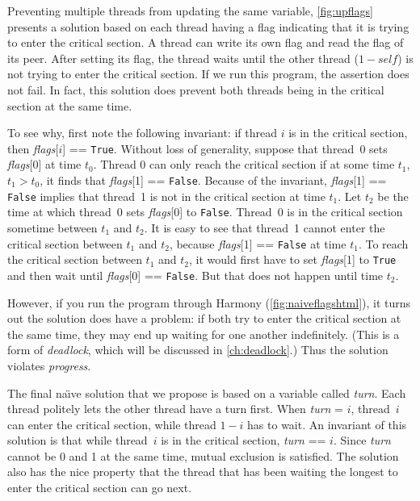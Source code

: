\documentclass{report}
\begin{document}
Preventing multiple threads from updating the same variable,
\autoref{fig:upflags} presents a solution based on each thread having
a flag indicating that it is trying to enter the critical section.
A thread can write its own flag and read the flag of its peer.
After setting its flag, the thread waits until the other thread
($1 - \mathit{self}$) is not trying to enter the critical section.
If we run this program, the assertion does not fail.  In fact, this
solution does prevent both threads being in the critical section at
the same time.

To see why, first note the following invariant: if thread $i$ is in the
critical section, then \textit{flags}[$i$] == \texttt{True}.
Without loss of generality,
suppose that thread~0 sets \textit{flags}[0] at time $t_0$.
Thread 0 can only reach the critical section if at some time $t_1$,
$t_1 > t_0$, it finds that \textit{flags}[1] == \texttt{False}.
Because of the invariant, \textit{flags}[1] == \texttt{False} implies that
thread~1 is not in the critical section at time $t_1$.
Let $t_2$ be the time at which thread~0 sets \textit{flags}[0]
to \texttt{False}.  Thread~0 is in the critical section sometime
between $t_1$ and $t_2$.
It is easy to see that thread~1 cannot enter the critical section
between $t_1$ and $t_2$, because \textit{flags}[1] == \texttt{False} at
time $t_1$.  To reach the critical section between $t_1$ and $t_2$,
it would first have to set \textit{flags}[1] to \texttt{True} and
then wait until \textit{flags}[0] == \texttt{False}.  But that does not happen
until time $t_2$.

However, if you run the program through Harmony (\autoref{fig:naiveflagshtml}),
it turns out the solution
does have a problem: if both try to enter the critical section at the same
time, they may end up waiting for one another indefinitely.
(This is a form of \emph{deadlock}, which will be discussed in
\autoref{ch:deadlock}.)
Thus the
solution violates \emph{progress}.

The final na\"{\i}ve solution that we propose
is based on a variable called \textit{turn}.
Each thread politely lets the other thread have a turn first.
When \textit{turn} = $i$, thread~$i$ can
enter the critical section, while thread $1-i$ has to wait.
An invariant of this solution is that while thread~$i$ is in the critical
section, \textit{turn} == $i$.
Since \textit{turn} cannot be 0 and 1 at
the same time, mutual exclusion is satisfied.
The solution also has the nice property that the thread that has been waiting the
longest to enter the critical section can go next.
\end{document}
